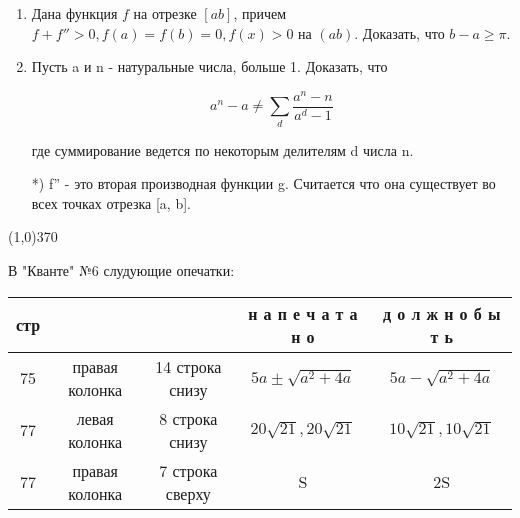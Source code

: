 \begin{multicols}{2}
\begin{enumerate}
\item Дана функция $f$ на отрезке $[ab]$, причем  $f + f'' > 0, f(a) = f(b) = 0, f(x)>0$ на $(ab)$.
Доказать, что $b-a \geqslant \pi $. %

\item Пусть a и n - натуральные числа, больше 1. Доказать, что 

\[a^n - a \neq \sum \limits_{d} \frac{a^n-n}{a^d-1} \]

где суммирование ведется по некоторым делителям d числа n.

*) f'' - это вторая производная функции g. Считается что она существует во всех точках отрезка [a, b].



\end{enumerate}
\end{multicols}

\line(1,0){370}

\begin{table}[b]

\begin{center}
В "Кванте" №6 слудующие опечатки:
\end{center}

\begin{tabular}{c|c|c|c|c}

стр & 	&	& н а п е ч а т а н о & д о л ж н о  б ы т ь	\\
\hline
75 & правая колонка & 14 строка снизу & $5a \pm  \sqrt{a^2 + 4a}$ & $5a -  \sqrt{a^2 + 4a}$ \\

77 & левая колонка & 8 строка снизу & $ 20 \sqrt{21}, 20 \sqrt{21} $ & $10 \sqrt{21}, 10 \sqrt{21}$\\

77 & правая колонка & 7 строка сверху & S & 2S


\end{tabular}


\end{table}